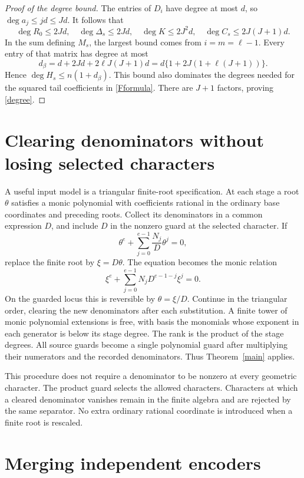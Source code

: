 \documentclass[11pt]{article}
\begin{document}
\begin{proof}[Proof of the degree bound]
The entries of $D_i$ have degree at most $d$, so
$\deg a_j\le jd\le Jd$. It follows that
\[
 \deg R_0\le2Jd,\quad
 \deg\Delta_s\le2Jd,\quad
 \deg K\le2J^2d,\quad
 \deg C_s\le2J(J+1)d.
\]
In the sum defining $M_s$, the largest bound comes from $i=m=\ell-1$.
Every entry of that matrix has degree at most
\[
 d_\beta=d+2Jd+2\ell J(J+1)d
          =d\{1+2J(1+\ell(J+1))\}.
\]
Hence $\deg H_s\le n(1+d_\beta)$. This bound also dominates the
degrees needed for the squared tail coefficients in \eqref{Fformula}.
There are $J+1$ factors, proving \eqref{degree}.
\end{proof}

\section{Clearing denominators without losing selected characters}
A useful input model is a triangular finite-root specification. At each
stage a root $\theta$ satisfies a monic polynomial with coefficients
rational in the ordinary base coordinates and preceding roots. Collect
its denominators in a common expression $D$, and include $D$ in the
nonzero guard at the selected character. If
\[
 \theta^e+\sum_{j=0}^{e-1}\frac{N_j}{D}\theta^j=0,
\]
replace the finite root by $\xi=D\theta$. The equation becomes the monic
relation
\[
                 \xi^e+\sum_{j=0}^{e-1}N_jD^{e-1-j}\xi^j=0.
\]
On the guarded locus this is reversible by $\theta=\xi/D$. Continue
in the triangular order, clearing the new denominators after each
substitution. A finite tower of monic polynomial extensions is free, with
basis the monomials whose exponent in each generator is below its stage
degree. The rank is the product of the stage degrees. All source guards
become a single polynomial guard after multiplying their numerators and
the recorded denominators. Thus Theorem~\ref{main} applies.

This procedure does not require a denominator to be nonzero at every
geometric character. The product guard selects the allowed characters.
Characters at which a cleared denominator vanishes remain in the finite
algebra and are rejected by the same separator. No extra ordinary
rational coordinate is introduced when a finite root is rescaled.

\section{Merging independent encoders}
\end{document}
